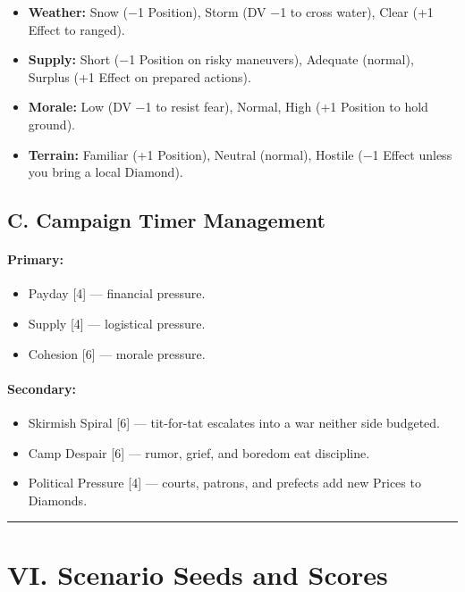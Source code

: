 \documentclass[11pt]{article}
\begin{document}
\begin{itemize}
    \item \textbf{Weather:} Snow (−1 Position), Storm (DV −1 to cross water), Clear (+1 Effect to ranged).
    \item \textbf{Supply:} Short (−1 Position on risky maneuvers), Adequate (normal), Surplus (+1 Effect on prepared actions).
    \item \textbf{Morale:} Low (DV −1 to resist fear), Normal, High (+1 Position to hold ground).
    \item \textbf{Terrain:} Familiar (+1 Position), Neutral (normal), Hostile (−1 Effect unless you bring a local Diamond).
\end{itemize}

\subsection*{C. Campaign Timer Management}

\paragraph{Primary:}
\begin{itemize}
    \item Payday [4] --- financial pressure.
    \item Supply [4] --- logistical pressure.
    \item Cohesion [6] --- morale pressure.
\end{itemize}

\paragraph{Secondary:}
\begin{itemize}
    \item Skirmish Spiral [6] --- tit-for-tat escalates into a war neither side budgeted.
    \item Camp Despair [6] --- rumor, grief, and boredom eat discipline.
    \item Political Pressure [4] --- courts, patrons, and prefects add new Prices to Diamonds.
\end{itemize}

\rule{\textwidth}{0.4pt}

\section*{VI. Scenario Seeds and Scores}
\end{document}
